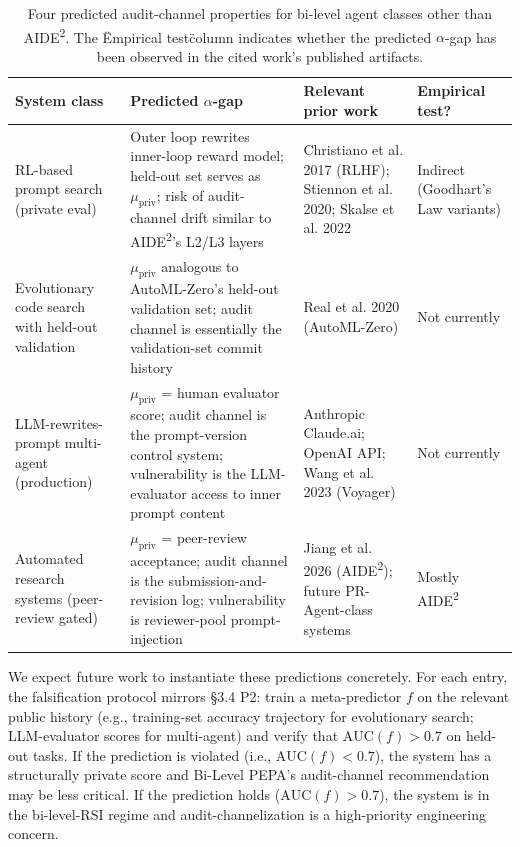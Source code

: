 \documentclass{article}
\theoremstyle{definition}
\begin{document}
\begin{table}[h]
\centering
\caption{Four predicted audit-channel properties for bi-level agent classes other than AIDE\textsuperscript{2}. The \"Empirical test\" column indicates whether the predicted $\alpha$-gap has been observed in the cited work's published artifacts.}
\label{tab:cross-system}
\begin{tabular}{p{} p{} p{} p{}}
\toprule
\textbf{System class} & \textbf{Predicted $\alpha$-gap} & \textbf{Relevant prior work} & \textbf{Empirical test?} \\
\midrule
RL-based prompt search (private eval) & Outer loop rewrites inner-loop reward model; held-out set serves as $\mu_{\text{priv}}$; risk of audit-channel drift similar to AIDE\textsuperscript{2}'s L2/L3 layers & Christiano et al. 2017 (RLHF); Stiennon et al. 2020; Skalse et al. 2022 & Indirect (Goodhart's Law variants) \\
Evolutionary code search with held-out validation & $\mu_{\text{priv}}$ analogous to AutoML-Zero's held-out validation set; audit channel is essentially the validation-set commit history & Real et al. 2020 (AutoML-Zero) & Not currently \\
LLM-rewrites-prompt multi-agent (production) & $\mu_{\text{priv}}$ = human evaluator score; audit channel is the prompt-version control system; vulnerability is the LLM-evaluator access to inner prompt content & Anthropic Claude.ai; OpenAI API; Wang et al. 2023 (Voyager) & Not currently \\
Automated research systems (peer-review gated) & $\mu_{\text{priv}}$ = peer-review acceptance; audit channel is the submission-and-revision log; vulnerability is reviewer-pool prompt-injection & Jiang et al. 2026 (AIDE\textsuperscript{2}); future PR-Agent-class systems & Mostly AIDE\textsuperscript{2} \\
\bottomrule
\end{tabular}
\end{table}

We expect future work to instantiate these predictions concretely. For each entry, the falsification protocol mirrors \S3.4 P2: train a meta-predictor $f$ on the relevant public history (e.g., training-set accuracy trajectory for evolutionary search; LLM-evaluator scores for multi-agent) and verify that $\text{AUC}(f) > 0.7$ on held-out tasks. If the prediction is violated (i.e., $\text{AUC}(f) < 0.7$), the system has a structurally private score and Bi-Level PEPA's audit-channel recommendation may be less critical. If the prediction holds ($\text{AUC}(f) > 0.7$), the system is in the bi-level-RSI regime and audit-channelization is a high-priority engineering concern.
\end{document}
